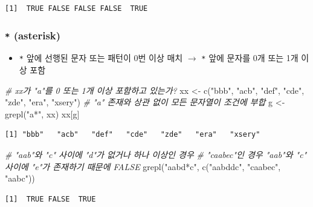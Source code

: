 \documentclass[
  11pt,
]{krantz}
\newenvironment{Shaded}{\begin{snugshade}}{\end{snugshade}}
\newcommand{\CommentTok}[1]{\textcolor[rgb]{0.37,0.37,0.37}{\textit{#1}}}
\newcommand{\FunctionTok}[1]{\textcolor[rgb]{0,0,0}{#1}}
\newcommand{\NormalTok}[1]{#1}
\newcommand{\OtherTok}[1]{\textcolor[rgb]{0.37,0.37,0.37}{#1}}
\newcommand{\StringTok}[1]{\textcolor[rgb]{0.5,0.5,0.5}{#1}}
\providecommand{\tightlist}{%
  \setlength{\itemsep}{0pt}\setlength{\parskip}{0pt}}
\begin{document}
\begin{verbatim}
[1]  TRUE FALSE FALSE FALSE  TRUE
\end{verbatim}

\normalsize

\hypertarget{asterisk}{%
\subsubsection*{\texorpdfstring{\textbf{\texttt{*} (asterisk)}}{* (asterisk)}}\label{asterisk}}


\begin{itemize}
\tightlist
\item
  \texttt{*} 앞에 선행된 문자 또는 패턴이 0번 이상 매치 \(\rightarrow\) \texttt{*} 앞에 문자를 0개 또는 1개 이상 포함
\end{itemize}

\footnotesize

\begin{Shaded}
\begin{Highlighting}[]
\CommentTok{\# xx가 "a"를 0 또는 1개 이상 포함하고 있는가?}
\NormalTok{xx }\OtherTok{\textless{}{-}} \FunctionTok{c}\NormalTok{(}\StringTok{"bbb"}\NormalTok{, }\StringTok{"acb"}\NormalTok{, }\StringTok{"def"}\NormalTok{, }\StringTok{"cde"}\NormalTok{, }\StringTok{"zde"}\NormalTok{, }\StringTok{"era"}\NormalTok{, }\StringTok{"xsery"}\NormalTok{)}
\CommentTok{\# "a" 존재와 상관 없이 모든 문자열이 조건에 부합}
\NormalTok{g }\OtherTok{\textless{}{-}} \FunctionTok{grepl}\NormalTok{(}\StringTok{"a*"}\NormalTok{, xx)}
\NormalTok{xx[g]}
\end{Highlighting}
\end{Shaded}

\begin{verbatim}
[1] "bbb"   "acb"   "def"   "cde"   "zde"   "era"   "xsery"
\end{verbatim}

\begin{Shaded}
\begin{Highlighting}[]
\CommentTok{\# "aab"와 "c" 사이에 "d"가 없거나 하나 이상인 경우 }
\CommentTok{\# "caabec"인 경우 "aab"와 "c" 사이에 "e"가 존재하기 때문에 FALSE}
\FunctionTok{grepl}\NormalTok{(}\StringTok{"aabd*c"}\NormalTok{, }\FunctionTok{c}\NormalTok{(}\StringTok{"aabddc"}\NormalTok{, }\StringTok{"caabec"}\NormalTok{, }\StringTok{"aabc"}\NormalTok{))}
\end{Highlighting}
\end{Shaded}

\begin{verbatim}
[1]  TRUE FALSE  TRUE
\end{verbatim}
\end{document}

